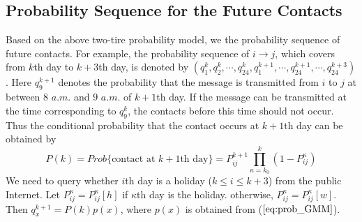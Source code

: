 \subsection{Probability Sequence for the Future Contacts}
Based on the above two-tire probability model,
we the probability sequence of future contacts.
For example, the probability sequence of $i \rightarrow j$, which covers from $k$th day to $k+3$th day,
is denoted by $(q^{k}_{1}, q^{k}_{2}, \cdots, q^{k}_{24}, q^{k+1}_{1}, \cdots, q^{k+1}_{24}, \cdots, q^{k+3}_{24})$.
Here $q^{k+1}_{9}$ denotes the probability that
the message is transmitted from $i$ to $j$ at between $8$ $a.m.$ and $9$ $a.m.$ of $k+1$th day.
If the message can be transmitted at the time corresponding to $q^{k}_{9}$,
the contacts before this time should not occur.
Thus the conditional probability that
the contact occurs at $k+1$th day can be obtained by
\begin{equation}
\label{eq:P_Cond}
P(k) = Prob\{\text{contact at $k+1$th day}\} = P^{k+1}_{ij}\prod_{\kappa=k_{0}}^{k} (1-P^{\kappa}_{ij})
\end{equation}
We need to query whether $i$th day is a holiday ($k \le i \le k+3$) from the public Internet.
Let $P^{\kappa}_{ij} = P^{\kappa}_{ij}[h]$ if $\kappa$th day is the holiday.
otherwise, $P^{\kappa}_{ij} = P^{\kappa}_{ij}[w]$.
Then $q^{k+1}_{x} = P(k)p(x)$, where $p(x)$ is obtained from ($\ref{eq:prob_GMM}$).


 

